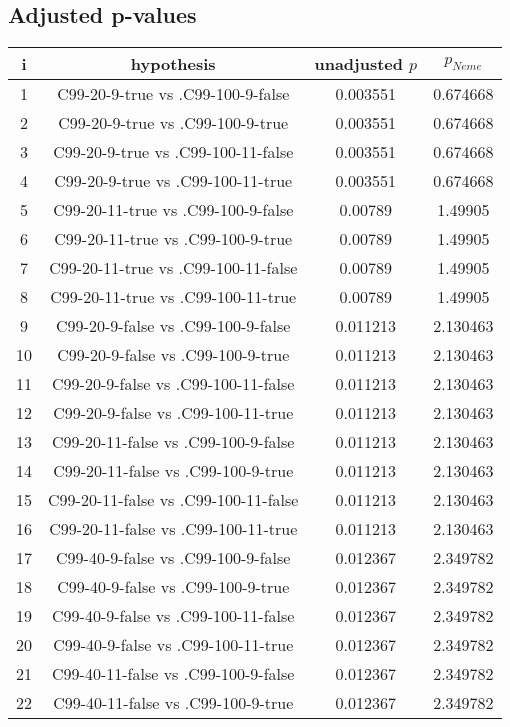 \documentclass[a4paper,10pt]{article}
\begin{document}
\begin{landscape}
\pagebreak

\subsection{Adjusted p-values}

\begin{table}[!htp]
\centering\scriptsize
\begin{tabular}{cccc}
i&hypothesis&unadjusted $p$&$p_{Neme}$\\
\hline1&C99-20-9-true vs .C99-100-9-false&0.003551&0.674668\\
2&C99-20-9-true vs .C99-100-9-true&0.003551&0.674668\\
3&C99-20-9-true vs .C99-100-11-false&0.003551&0.674668\\
4&C99-20-9-true vs .C99-100-11-true&0.003551&0.674668\\
5&C99-20-11-true vs .C99-100-9-false&0.00789&1.49905\\
6&C99-20-11-true vs .C99-100-9-true&0.00789&1.49905\\
7&C99-20-11-true vs .C99-100-11-false&0.00789&1.49905\\
8&C99-20-11-true vs .C99-100-11-true&0.00789&1.49905\\
9&C99-20-9-false vs .C99-100-9-false&0.011213&2.130463\\
10&C99-20-9-false vs .C99-100-9-true&0.011213&2.130463\\
11&C99-20-9-false vs .C99-100-11-false&0.011213&2.130463\\
12&C99-20-9-false vs .C99-100-11-true&0.011213&2.130463\\
13&C99-20-11-false vs .C99-100-9-false&0.011213&2.130463\\
14&C99-20-11-false vs .C99-100-9-true&0.011213&2.130463\\
15&C99-20-11-false vs .C99-100-11-false&0.011213&2.130463\\
16&C99-20-11-false vs .C99-100-11-true&0.011213&2.130463\\
17&C99-40-9-false vs .C99-100-9-false&0.012367&2.349782\\
18&C99-40-9-false vs .C99-100-9-true&0.012367&2.349782\\
19&C99-40-9-false vs .C99-100-11-false&0.012367&2.349782\\
20&C99-40-9-false vs .C99-100-11-true&0.012367&2.349782\\
21&C99-40-11-false vs .C99-100-9-false&0.012367&2.349782\\
22&C99-40-11-false vs .C99-100-9-true&0.012367&2.349782\\

\end{tabular}
\end{table}
\end{landscape}
\end{document}
